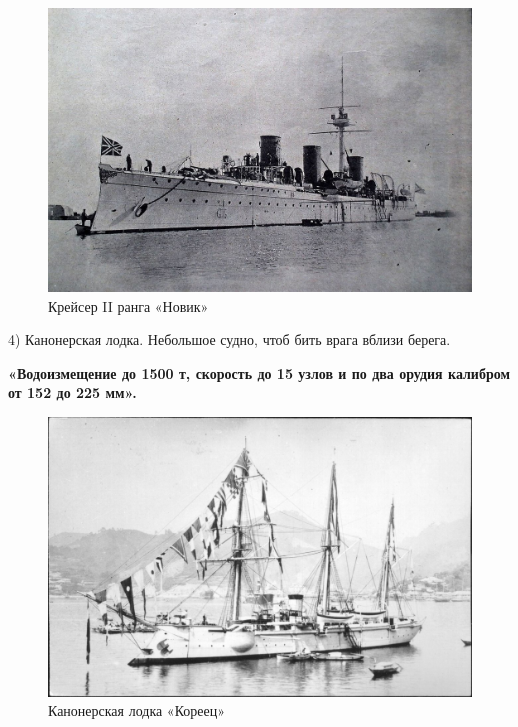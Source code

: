 \begin{figure}[h!tb] 
	\centering\includegraphics[scale=0.3]{Data/RYAV_sily_storon/f7G2P9E6i0c.jpg}
	\caption{Крейсер II ранга «Новик» }
\end{figure}

4) Канонерская лодка. Небольшое судно, чтоб бить врага вблизи берега.

\textbf{«Водоизмещение до 1500 т, скорость до 15 узлов и по два орудия калибром от 152 до 225 мм».}

\begin{figure}[h!tb] 
	\centering\includegraphics[scale=0.3]{Data/RYAV_sily_storon/7qe4VyVHQn0.jpg}
	\caption{Канонерская лодка «Кореец»
	 }
\end{figure}

